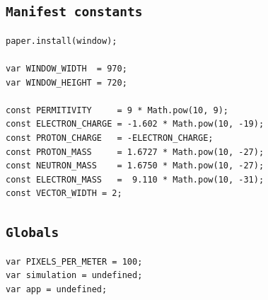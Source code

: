 \documentclass[11pt]{article}
\begin{document}
\subsection{\texttt{Manifest constants}}
\label{sec-8-2}
\begin{verbatim}
paper.install(window);

var WINDOW_WIDTH  = 970;
var WINDOW_HEIGHT = 720;

const PERMITIVITY     = 9 * Math.pow(10, 9);
const ELECTRON_CHARGE = -1.602 * Math.pow(10, -19);
const PROTON_CHARGE   = -ELECTRON_CHARGE;
const PROTON_MASS     = 1.6727 * Math.pow(10, -27);
const NEUTRON_MASS    = 1.6750 * Math.pow(10, -27);
const ELECTRON_MASS   =  9.110 * Math.pow(10, -31);
const VECTOR_WIDTH = 2;
\end{verbatim}

\subsection{\texttt{Globals}}
\label{sec-8-3}
\begin{verbatim}
var PIXELS_PER_METER = 100;
var simulation = undefined;
var app = undefined;
\end{verbatim}
\end{document}

